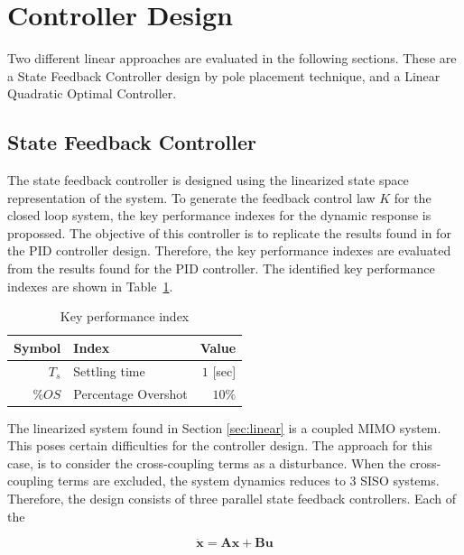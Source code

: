 \documentclass[12pt]{article}
\begin{document}
\section{Controller Design}

Two different linear approaches are evaluated in the following sections. These are a State Feedback Controller design by pole placement technique, and a Linear Quadratic Optimal Controller.

\subsection{State Feedback Controller}
\label{sec:state-feedback}

The state feedback controller is designed using the linearized state space representation of the system. To generate the feedback control law $K$ for the closed loop system, the key performance indexes for the dynamic response is propossed. The objective of this controller is to replicate the results found in \cite{Boua04} for the PID controller design. Therefore, the key performance indexes are evaluated from the results found for the PID controller. The identified key performance indexes are shown in Table~\ref{tab:KPI}.

\begin{table}
  \begin{center}
    \caption{Key performance index}
    \label{tab:KPI}
    \begin{tabular}{rlr}
      \hline
      Symbol & Index & Value \\
      \hline                  
      $T_s$ & Settling time & $1$ [sec]\\
      $\%OS$ & Percentage Overshot & $10\%$\\
      \hline
    \end{tabular}
  \end{center}
\end{table}

The linearized system found in Section \ref{sec:linear} is a coupled MIMO system. This poses certain difficulties for the controller design. The approach for this case, is to consider the cross-coupling terms as a disturbance. When the cross-coupling terms are excluded, the system dynamics reduces to 3 SISO systems. Therefore, the design consists of three parallel state feedback controllers. Each of the 

\begin{equation}
\dot{\mathbf{x}} = \mathbf{A} \mathbf{x} + \mathbf{B} \mathbf{u}
\end{equation}
\end{document}
